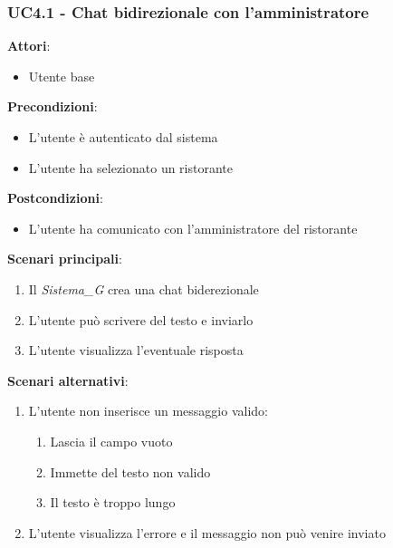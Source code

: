 \subsubsection{UC4.1 - Chat bidirezionale con l'amministratore}\label{usecase:4_1}
\textbf{Attori}:
\begin{itemize}
    \item Utente base
\end{itemize}
\textbf{Precondizioni}:
\begin{itemize}
    \item L'utente è autenticato dal sistema
    \item L'utente ha selezionato un ristorante
\end{itemize}
\textbf{Postcondizioni}:
\begin{itemize}
    \item L'utente ha comunicato con l'amministratore del ristorante
\end{itemize}
\textbf{Scenari principali}:
\begin{enumerate}
    \item Il \textit{Sistema_G} crea una chat biderezionale
    \item L'utente può scrivere del testo e inviarlo
    \item L'utente visualizza l'eventuale risposta
\end{enumerate}
\textbf{Scenari alternativi}:
\begin{enumerate}
    \item L'utente non inserisce un messaggio valido:
    \begin{enumerate}
        \item Lascia il campo vuoto
        \item Immette del testo non valido
        \item Il testo è troppo lungo
    \end{enumerate}
    \item L'utente visualizza l'errore e il messaggio non può venire inviato
\end{enumerate}